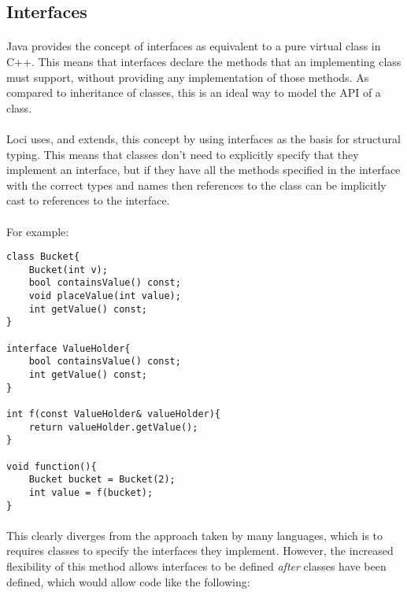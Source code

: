 \documentclass[12pt,twoside,notitlepage]{report}
\begin{document}
\clearpage

\subsection{Interfaces}

\paragraph{}
Java provides the concept of interfaces as equivalent to a pure virtual class in C++. This means that interfaces declare the methods that an implementing class must support, without providing any implementation of those methods. As compared to inheritance of classes, this is an ideal way to model the API of a class.

\paragraph{}
Loci uses, and extends, this concept by using interfaces as the basis for structural typing. This means that classes don't need to explicitly specify that they implement an interface, but if they have all the methods specified in the interface with the correct types and names then references to the class can be implicitly cast to references to the interface.

\paragraph{}
For example:


\begin{lstlisting}
class Bucket{
	Bucket(int v);
	bool containsValue() const;
	void placeValue(int value);
	int getValue() const;
}

interface ValueHolder{
	bool containsValue() const;
	int getValue() const;
}

int f(const ValueHolder& valueHolder){
	return valueHolder.getValue();
}

void function(){
	Bucket bucket = Bucket(2);
	int value = f(bucket);
}
\end{lstlisting}


\paragraph{}
This clearly diverges from the approach taken by many languages, which is to requires classes to specify the interfaces they implement. However, the increased flexibility of this method allows interfaces to be defined \emph{after} classes have been defined, which would allow code like the following:
\end{document}
